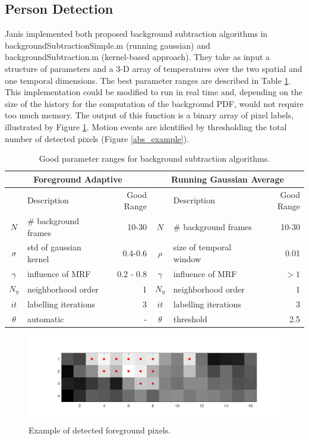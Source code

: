 \documentclass[12pt,oneside]{article} %
\begin{document}
\subsection{Person Detection}
Janis implemented both proposed background subtraction algorithms in backgroundSubtractionSimple.m 
(running gaussian) and backgroundSubtraction.m (kernel-based approach).
They take as input a structure of parameters
and a 3-D array of temperatures over the two spatial and one temporal dimensions. 
The best parameter ranges are described in Table \ref{bs_paramstable}.
This implementation could
be modified to run in real time and, depending on the size of the history for the computation of the background
PDF, would not require too much memory. The output of this function is a binary array of pixel labels, illustrated
by Figure \ref{foregroundexample}. Motion events are identified by
thresholding the total number of detected pixels (Figure \ref{abs_example}).
\begin{table}\begin{tabular}{|clr|clr|}
\hline
\multicolumn{3}{|c|}{Foreground Adaptive} & \multicolumn{3}{|c|}{Running Gaussian Average}\\
\hline
& Description & Good Range & & Description & Good Range\\
\hline
$N$ & \# background frames & 10-30 & $N$ & \# background frames & 10-30\\
$\sigma$ & std of gaussian kernel & 0.4-0.6 & $\rho$ & size of temporal window & 0.01\\
$\gamma$ & influence of MRF & 0.2 - 0.8 & $\gamma$ & influence of MRF & $>1$\\
$N_\eta$ & neighborhood order & 1 & $N_\eta$ & neighborhood order & 1\\
$it$ & labelling iterations & 3 & $it$ & labelling iterations & 3\\
$\theta$ & automatic & - & $\theta$ & threshold & 2.5\\
\hline
\end{tabular}
\caption{Good parameter ranges for background subtraction algorithms.}
\label{bs_paramstable}
\end{table}

\begin{figure}[htb] 
\centering
\includegraphics[scale=0.45]{images/foreground_example.png}
\caption{Example of detected foreground pixels.}
\label{foregroundexample}
\end{figure}
\end{document}
